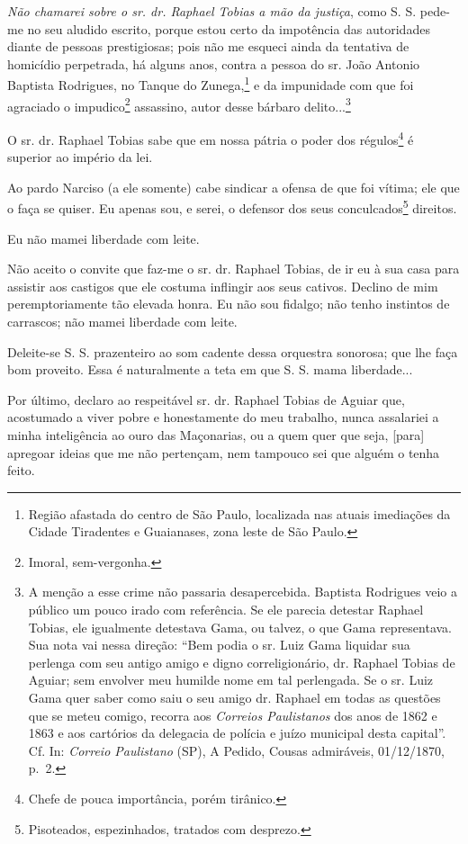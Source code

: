 {\emph{Não chamarei sobre o sr. dr. Raphael Tobias a mão da justiça},
como S. S. pede-me no seu aludido escrito, porque estou certo da
impotência das autoridades diante de pessoas prestigiosas; pois não me
esqueci ainda da tentativa de homicídio perpetrada, há alguns anos,
contra a pessoa do sr. João Antonio Baptista Rodrigues, no Tanque do
Zunega,\footnote{ Região afastada do centro de São Paulo, localizada
  nas atuais imediações da Cidade Tiradentes e Guaianases, zona leste de
  São Paulo.} e da impunidade com que foi agraciado o
impudico\footnote{ Imoral, sem-vergonha.} assassino, autor desse
bárbaro delito...\footnote{ A menção a esse crime não passaria
  desapercebida. Baptista Rodrigues veio a público um pouco irado com
  referência. Se ele parecia detestar Raphael Tobias, ele igualmente
  detestava Gama, ou talvez, o que Gama representava. Sua nota vai nessa
  direção: ``Bem podia o sr. Luiz Gama liquidar sua perlenga com seu
  antigo amigo e digno correligionário, dr. Raphael Tobias de Aguiar;
  sem envolver meu humilde nome em tal perlengada. Se o sr. Luiz Gama
  quer saber como saiu o seu amigo dr. Raphael em todas as questões que
  se meteu comigo, recorra aos \emph{Correios Paulistanos} dos anos de
  1862 e 1863 e aos cartórios da delegacia de polícia e juízo municipal
  desta capital''. Cf. In: \emph{Correio Paulistano} (SP), A Pedido,
  Cousas admiráveis, 01/12/1870, p.~2.}

O sr. dr. Raphael Tobias sabe que em nossa pátria o poder dos
régulos\footnote{ Chefe de pouca importância, porém tirânico.} é
superior ao império da lei.

Ao pardo Narciso (a ele somente) cabe sindicar a ofensa de que foi
vítima; ele que o faça se quiser. Eu apenas sou, e serei, o defensor dos
seus conculcados\footnote{ Pisoteados, espezinhados, tratados com
  desprezo.} direitos.

Eu não mamei liberdade com leite.

Não aceito o convite que faz-me o sr. dr. Raphael Tobias, de ir eu à sua
casa para assistir aos castigos que ele costuma inflingir aos seus
cativos. Declino de mim peremptoriamente tão elevada honra. Eu não sou
fidalgo; não tenho instintos de carrascos; não mamei liberdade com
leite.

Deleite-se S. S. prazenteiro ao som cadente dessa orquestra sonorosa;
que lhe faça bom proveito. Essa é naturalmente a teta em que S. S. mama
liberdade...

Por último, declaro ao respeitável sr. dr. Raphael Tobias de Aguiar que,
acostumado a viver pobre e honestamente do meu trabalho, nunca
assalariei a minha inteligência ao ouro das Maçonarias, ou a quem quer
que seja, {[}para{]} apregoar ideias que me não pertençam, nem tampouco
sei que alguém o tenha feito.

}
